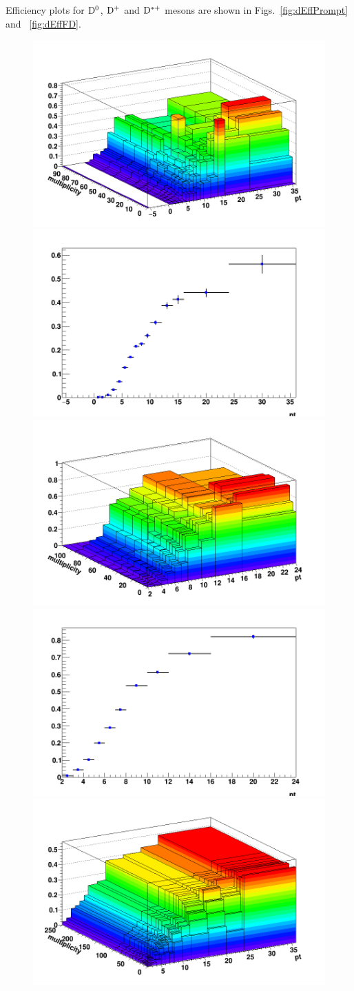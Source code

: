 Efficiency plots for ${\rm D^0}$, ${\rm D^+}$ and ${\rm D^{*+}}$ mesons are shown in Figs.~\ref{fig:dEffPrompt} and ~\ref{fig:dEffFD}.

\begin{figure}[!htp]     %
	\centering
    \includegraphics[width=.48\linewidth]{figures/Effs/EfficiencyMap_2D_DPlus_c_Ref_wLimAcc_Plot.png}
	\includegraphics[width=.48\linewidth]{figures/Effs/EfficiencyMap_1D_DPlus_c_Ref_wLimAcc_Plot.png}  %
	\includegraphics[width=.48\linewidth]{figures/DStar_pp/EfficiencyMap_2D_DStar_c_final_wLimAcc_Plot.png}
	\includegraphics[width=.48\linewidth]{figures/DStar_pp/EfficiencyMap_1D_DStar_c_final_wLimAcc_Plot.png}  %
	\includegraphics[width=.48\linewidth]{figures/Effs/EfficiencyMap_2D_Dzero_c_RefPtBins_wLimAcc_Plot.png}

\end{figure}
